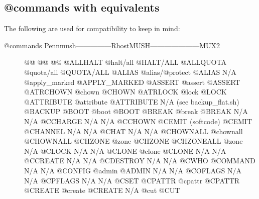 \documentclass[letterpaper,10pt,english]{sphinxmanual}
\begin{document}
\subsection{@commands with equivalents}
\label{\detokenize{differences:commands-with-equivalents}}
\sphinxAtStartPar
The following are used for compatibility to keep in mind:
\begin{description}
\item[{@commands Pennmush—————\sphinxhyphen{}RhostMUSH———————\sphinxhyphen{}MUX2}] \leavevmode
\sphinxAtStartPar
@@                      @@                             @@
@ALLHALT                @halt/all                      @HALT/ALL
@ALLQUOTA               @quota/all                     @QUOTA/ALL
@ALIAS                  @alias/@protect                @ALIAS
N/A                     @apply\_marked                  @APPLY\_MARKED
@ASSERT                 @assert                        @ASSERT
@ATRCHOWN               @chown                         @CHOWN
@ATRLOCK                @lock                          @LOCK
@ATTRIBUTE              @attribute                     @ATTRIBUTE
N/A                     (see backup\_flat.sh)           @BACKUP
@BOOT                   @boot                          @BOOT
@BREAK                  @break                         @BREAK
N/A                     N/A                            @CCHARGE
N/A                     N/A                            @CCHOWN
@CEMIT                  (softcode)                     @CEMIT
@CHANNEL                N/A                            N/A
@CHAT                   N/A                            N/A
@CHOWNALL               @chownall                      @CHOWNALL
@CHZONE                 @zone                          @CHZONE
@CHZONEALL              @zone                          N/A
@CLOCK                  N/A                            N/A
@CLONE                  @clone                         @CLONE
N/A                     N/A                            @CCREATE
N/A                     N/A                            @CDESTROY
N/A                     N/A                            @CWHO
@COMMAND                N/A                            N/A
@CONFIG                 @admin                         @ADMIN
N/A                     N/A                            @COFLAGS
N/A                     N/A                            @CPFLAGS
N/A                     N/A                            @CSET
@CPATTR                 @cpattr                        @CPATTR
@CREATE                 @create                        @CREATE
N/A                     @cut                           @CUT

\end{description}
\end{document}
